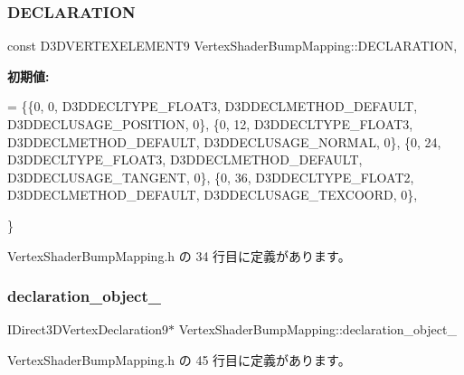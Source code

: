 \subsubsection{\texorpdfstring{D\+E\+C\+L\+A\+R\+A\+T\+I\+ON}{DECLARATION}}
{\footnotesize\ttfamily const D3\+D\+V\+E\+R\+T\+E\+X\+E\+L\+E\+M\+E\+N\+T9 Vertex\+Shader\+Bump\+Mapping\+::\+D\+E\+C\+L\+A\+R\+A\+T\+I\+ON\hspace{0.3cm}{\ttfamily [static]}, {\ttfamily [private]}}

{\bfseries 初期値\+:}
\begin{DoxyCode}
= \{\{0,  0, D3DDECLTYPE\_FLOAT3, D3DDECLMETHOD\_DEFAULT, D3DDECLUSAGE\_POSITION, 0\},
   \{0, 12, D3DDECLTYPE\_FLOAT3, D3DDECLMETHOD\_DEFAULT, D3DDECLUSAGE\_NORMAL,   0\},
   \{0, 24, D3DDECLTYPE\_FLOAT3, D3DDECLMETHOD\_DEFAULT, D3DDECLUSAGE\_TANGENT,  0\},
   \{0, 36, D3DDECLTYPE\_FLOAT2, D3DDECLMETHOD\_DEFAULT, D3DDECLUSAGE\_TEXCOORD, 0\},

\}
\end{DoxyCode}


 Vertex\+Shader\+Bump\+Mapping.\+h の 34 行目に定義があります。

\mbox{\label{class_vertex_shader_bump_mapping_a6e45d81a2a9c8ba7071b7f2686264a49}} 
\subsubsection{\texorpdfstring{declaration\+\_\+object\+\_\+}{declaration\_object\_}}
{\footnotesize\ttfamily I\+Direct3\+D\+Vertex\+Declaration9$\ast$ Vertex\+Shader\+Bump\+Mapping\+::declaration\+\_\+object\+\_\+\hspace{0.3cm}{\ttfamily [private]}}



 Vertex\+Shader\+Bump\+Mapping.\+h の 45 行目に定義があります。

\mbox{\label{class_vertex_shader_bump_mapping_add6402e968835f3fe5e9c7681c33daef}} 
